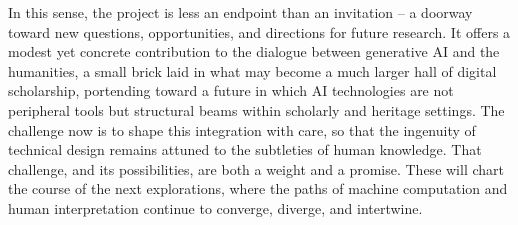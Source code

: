 \begin{spacing}{1.5}
In this sense, the project is less an endpoint than an invitation -- a doorway toward new questions, opportunities, and directions for future research. It offers a modest yet concrete contribution to the dialogue between generative AI and the humanities, a small brick laid in what may become a much larger hall of digital scholarship, portending toward a future in which AI technologies are not peripheral tools but structural beams within scholarly and heritage settings. The challenge now is to shape this integration with care, so that the ingenuity of technical design remains attuned to the subtleties of human knowledge. That challenge, and its possibilities, are both a weight and a promise. These will chart the course of the next explorations, where the paths of machine computation and human interpretation continue to converge, diverge, and intertwine.


\end{spacing}
